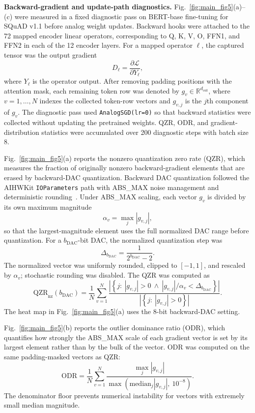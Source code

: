 \documentclass[AMA,LATO2COL]{WileyNJDv5}
\begin{document}
\noindent\textbf{Backward-gradient and update-path diagnostics.}
Fig.~\ref{fig:main_fig5}(a)--(c) were measured in a fixed diagnostic pass on BERT-base fine-tuning for SQuAD v1.1 before analog weight updates. 
Backward hooks were attached to the 72 mapped encoder linear operators, corresponding to Q, K, V, O, FFN1, and FFN2 in each of the 12 encoder layers. 
For a mapped operator \(\ell\), the captured tensor was the output gradient
\[
D_{\ell}=\frac{\partial \mathcal{L}}{\partial Y_{\ell}},
\]
where \(Y_{\ell}\) is the operator output. 
After removing padding positions with the attention mask, each remaining token row was denoted by
\(g_v\in\mathbb{R}^{d_{\mathrm{out}}}\), where \(v=1,\ldots,N\) indexes the collected token-row vectors and \(g_{v,j}\) is the \(j\)th component of \(g_v\). 
The diagnostic pass used \texttt{AnalogSGD(lr=0)} so that backward statistics were collected without updating the pretrained weights. 
QZR, ODR, and gradient-distribution statistics were accumulated over 200 diagnostic steps with batch size 8.

Fig.~\ref{fig:main_fig5}(a) reports the nonzero quantization zero rate (QZR), which measures the fraction of originally nonzero backward-gradient elements that are erased by backward-DAC quantization. 
Backward DAC quantization followed the AIHWKit \texttt{IOParameters} path with ABS\_MAX noise management and deterministic rounding~\cite{rasch2021aihwkit,legallo2023aihwkit}. 
Under ABS\_MAX scaling, each vector \(g_v\) is divided by its own maximum magnitude
\[
\alpha_v=\max_j |g_{v,j}|,
\]
so that the largest-magnitude element uses the full normalized DAC range before quantization. 
For a \(b_{\mathrm{DAC}}\)-bit DAC, the normalized quantization step was
\[
\Delta_{b_{\mathrm{DAC}}}=\frac{1}{2^{b_{\mathrm{DAC}}}-2}.
\]
The normalized vector was uniformly rounded, clipped to \([-1,1]\), and rescaled by \(\alpha_v\); stochastic rounding was disabled. 
The QZR was computed as
\begin{equation}
\mathrm{QZR}_{\mathrm{nz}}(b_{\mathrm{DAC}})
=
\frac{1}{N}
\sum_{v=1}^{N}
\frac{
\left|\left\{j:\ |g_{v,j}|>0\ \wedge\ |g_{v,j}|/\alpha_v < \Delta_{b_{\mathrm{DAC}}}\right\}\right|
}{
\left|\left\{j:\ |g_{v,j}|>0\right\}\right|
}.
\label{eq:qzr_def}
\end{equation}
The heat map in Fig.~\ref{fig:main_fig5}(a) uses the 8-bit backward-DAC setting.

Fig.~\ref{fig:main_fig5}(b) reports the outlier dominance ratio (ODR), which quantifies how strongly the ABS\_MAX scale of each gradient vector is set by its largest element rather than by the bulk of the vector. 
ODR was computed on the same padding-masked vectors as QZR:
\begin{equation}
\mathrm{ODR}
=
\frac{1}{N}
\sum_{v=1}^{N}
\frac{
\max_j |g_{v,j}|
}{
\max\left(\mathrm{median}_j |g_{v,j}|,\ 10^{-8}\right)
}.
\label{eq:odr_def}
\end{equation}
The denominator floor prevents numerical instability for vectors with extremely small median magnitude.
\end{document}
